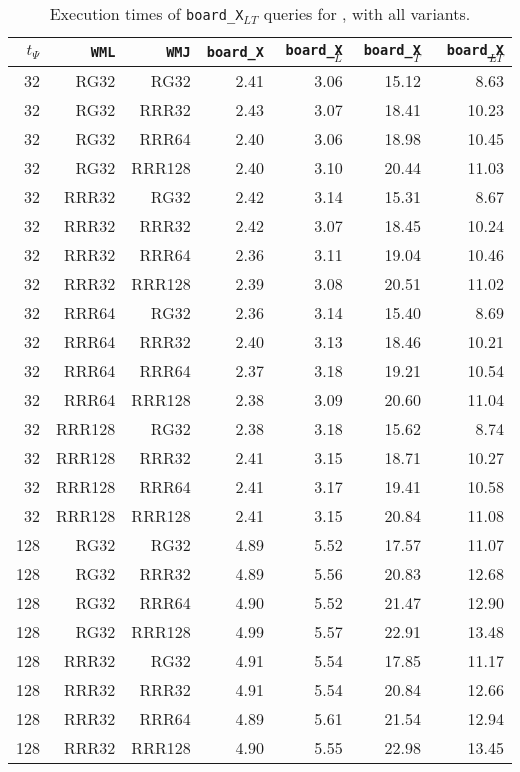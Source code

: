 \begin{table}
\caption{Execution times of \texttt{board\_X$_{LT}$} queries for \ctr, with all variants.}
\begin{tabular}{|r|r|r|r|r|r|r|}
\hline
$t_{\Psi}$ & \texttt{WML} & \texttt{WMJ} & \texttt{board\_X} & \texttt{board\_X$_{L}$} & \texttt{board\_X$_{T}$} & \texttt{board\_X$_{LT}$} \\
\hline
32 & RG32 & RG32 & 2.41 & 3.06 & 15.12 & 8.63 \\
32 & RG32 & RRR32 & 2.43 & 3.07 & 18.41 & 10.23 \\
32 & RG32 & RRR64 & 2.40 & 3.06 & 18.98 & 10.45 \\
32 & RG32 & RRR128 & 2.40 & 3.10 & 20.44 & 11.03 \\
32 & RRR32 & RG32 & 2.42 & 3.14 & 15.31 & 8.67 \\
32 & RRR32 & RRR32 & 2.42 & 3.07 & 18.45 & 10.24 \\
32 & RRR32 & RRR64 & 2.36 & 3.11 & 19.04 & 10.46 \\
32 & RRR32 & RRR128 & 2.39 & 3.08 & 20.51 & 11.02 \\
32 & RRR64 & RG32 & 2.36 & 3.14 & 15.40 & 8.69 \\
32 & RRR64 & RRR32 & 2.40 & 3.13 & 18.46 & 10.21 \\
32 & RRR64 & RRR64 & 2.37 & 3.18 & 19.21 & 10.54 \\
32 & RRR64 & RRR128 & 2.38 & 3.09 & 20.60 & 11.04 \\
32 & RRR128 & RG32 & 2.38 & 3.18 & 15.62 & 8.74 \\
32 & RRR128 & RRR32 & 2.41 & 3.15 & 18.71 & 10.27 \\
32 & RRR128 & RRR64 & 2.41 & 3.17 & 19.41 & 10.58 \\
32 & RRR128 & RRR128 & 2.41 & 3.15 & 20.84 & 11.08 \\
128 & RG32 & RG32 & 4.89 & 5.52 & 17.57 & 11.07 \\
128 & RG32 & RRR32 & 4.89 & 5.56 & 20.83 & 12.68 \\
128 & RG32 & RRR64 & 4.90 & 5.52 & 21.47 & 12.90 \\
128 & RG32 & RRR128 & 4.99 & 5.57 & 22.91 & 13.48 \\
128 & RRR32 & RG32 & 4.91 & 5.54 & 17.85 & 11.17 \\
128 & RRR32 & RRR32 & 4.91 & 5.54 & 20.84 & 12.66 \\
128 & RRR32 & RRR64 & 4.89 & 5.61 & 21.54 & 12.94 \\
128 & RRR32 & RRR128 & 4.90 & 5.55 & 22.98 & 13.45 \\

\end{tabular}
\end{table}
